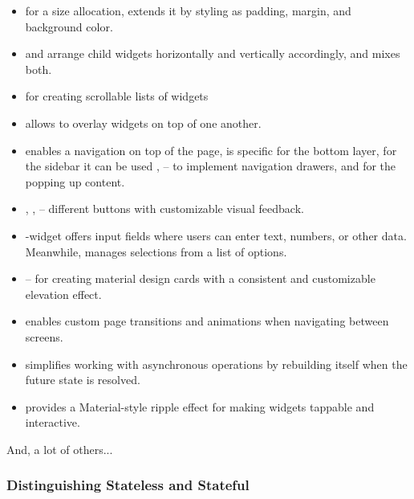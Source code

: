 \begin{itemize}
  \item {} for a size allocation,  extends it by styling as padding, margin, and background color.

  \item {} and  arrange child widgets horizontally and vertically accordingly, and   
  mixes both.

  \item {} for creating scrollable lists of widgets

  \item {} allows to overlay widgets on top of one another.

  \item {} enables a navigation on top of the page,  is specific for the bottom 
  layer, for the sidebar it can be used ,  -- to implement navigation drawers, and 
   for the popping up content.

  \item {}, ,  -- different buttons with customizable visual feedback.

  \item {}-widget offers input fields where users can enter text, numbers, or other data. Meanwhile,
   manages selections from a list of options.
  
  \item {} -- for creating material design cards with a consistent and customizable elevation effect.

  \item {} enables custom page transitions and animations when navigating between screens.

  \item {} simplifies working with asynchronous operations by rebuilding itself when the future state is 
  resolved.

  \item {} provides a Material-style ripple effect for making widgets tappable and interactive.
\end{itemize}

\noindent And, a lot of others...


\newpage
\subsubsection{Distinguishing Stateless and Stateful} \label{flutter-state}

